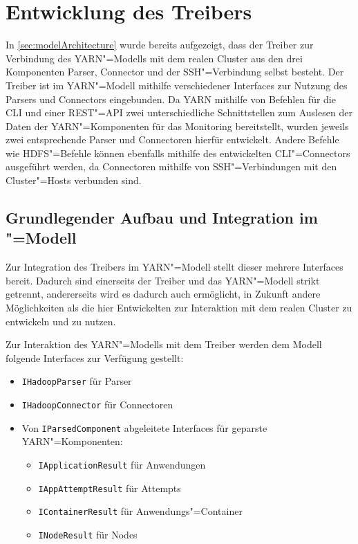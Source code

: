 \section{Entwicklung des Treibers}
\label{sec:sshDriver}

In \cref{sec:modelArchitecture} wurde bereits aufgezeigt, dass der Treiber zur Verbindung des YARN"=Modells mit dem realen Cluster aus den drei Komponenten Parser, Connector und der SSH"=Verbindung selbst besteht.
Der Treiber ist im YARN"=Modell mithilfe verschiedener Interfaces zur Nutzung des Parsers und Connectors eingebunden.
Da YARN mithilfe von Befehlen für die \gls{CLI} und einer REST"=API zwei unterschiedliche Schnittstellen zum Auslesen der Daten der YARN"=Komponenten für das Monitoring bereitstellt, wurden jeweils zwei entsprechende Parser und Connectoren hierfür entwickelt.
Andere Befehle wie \zB HDFS"=Befehle können ebenfalls mithilfe des entwickelten \gls{CLI}"=Connectors ausgeführt werden, da Connectoren mithilfe von SSH"=Verbindungen mit den Cluster"=Hosts verbunden sind.

\subsection{Grundlegender Aufbau und Integration im "=Modell}
\label{subsec:driverModelIntegration}

Zur Integration des Treibers im YARN"=Modell stellt dieser mehrere Interfaces bereit.
Dadurch sind einerseits der Treiber und das YARN"=Modell strikt getrennt, andererseits wird es dadurch auch ermöglicht, in Zukunft andere Möglichkeiten als die hier Entwickelten zur Interaktion mit dem realen Cluster zu entwickeln und zu nutzen.

Zur Interaktion des YARN"=Modells mit dem Treiber werden dem Modell folgende Interfaces zur Verfügung gestellt:

\begin{itemize}
    \item \texttt{IHadoopParser} für Parser
    \item \texttt{IHadoopConnector} für Connectoren
    \item Von \texttt{IParsedComponent} abgeleitete Interfaces für geparste YARN"=Komponenten:
    \begin{itemize}
        \item \texttt{IApplicationResult} für Anwendungen
        \item \texttt{IAppAttemptResult} für Attempts
        \item \texttt{IContainerResult} für Anwendungs"=Container
        \item \texttt{INodeResult} für Nodes
    \end{itemize}
\end{itemize}

